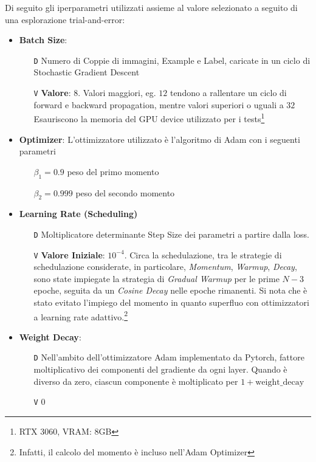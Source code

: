\documentclass[a4paper,10pt,twocolumn]{article}
\begin{document}
Di seguito gli iperparametri utilizzati assieme al valore selezionato a seguito di una esplorazione trial-and-error:
\begin{itemize}[topsep=0pt, noitemsep]
  \item \textbf{Batch Size}:
    \begin{itemize}[topsep=0pt, noitemsep]
      \item[\texttt{D}] Numero di Coppie di immagini, Example e Label, caricate in un ciclo di Stochastic Gradient Descent
      \item[\texttt{V}] \textbf{Valore}: $8$. Valori maggiori, eg. $12$ tendono a rallentare un ciclo di forward e backward propagation,
        mentre valori superiori o uguali a $32$ Esauriscono la
        memoria del GPU device utilizzato per i tests\footnote{RTX 3060, VRAM: 8GB}\\
    \end{itemize}

  \item
    \textbf{Optimizer}: L'ottimizzatore utilizzato \`e l'algoritmo di Adam con i seguenti parametri
    \begin{itemize}[topsep=0pt, noitemsep]
      \item[] $\beta_1 = 0.9$ peso del primo momento
      \item[] $\beta_2 = 0.999$ peso del secondo momento
    \end{itemize}

  \item
    \textbf{Learning Rate (Scheduling)}
    \begin{itemize}[topsep=0pt, noitemsep]
      \item[\texttt{D}] Moltiplicatore determinante Step Size dei parametri a partire dalla loss.
      \item[\texttt{V}] \textbf{Valore Iniziale}: $10^{-4}$. Circa la schedulazione, tra le strategie di schedulazione considerate,
        in particolare, \textit{Momentum}, \textit{Warmup}, \textit{Decay}, sono state impiegate la strategia di \textit{Gradual Warmup}
        per le prime $N - 3$ epoche, seguita da un \textit{Cosine Decay} nelle
        epoche rimanenti. Si nota che \`e stato evitato l'impiego del momento in quanto superfluo con ottimizzatori a learning
        rate adattivo.\footnote{Infatti, il calcolo del momento \`e incluso nell'Adam Optimizer}
    \end{itemize}

  \item
    \textbf{Weight Decay}:
    \begin{itemize}[topsep=0pt, noitemsep]
      \item[\texttt{D}] Nell'ambito dell'ottimizzatore Adam implementato da Pytorch, fattore moltiplicativo dei componenti del gradiente da
        ogni layer.  Quando \`e diverso da zero, ciascun componente \`e moltiplicato per $1 + \mathrm{weight\_decay}$
      \item[\texttt{V}] $0$
    \end{itemize}


\end{itemize}
\end{document}
